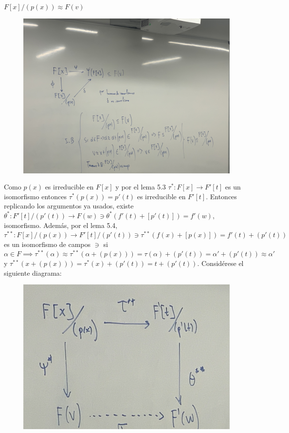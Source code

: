 \begin{teorema}[5I]
\begin{dem}
        
        $F[x]/(p(x))\approx F(v)$ 
        \begin{figure}[H]
            \centering
            \includegraphics[scale=0.2]{imagenes/25.1.jpeg}
        \end{figure}
        Como $p(x)$ es irreducible en $F[x]$ y por el lema 5.3 $\tau^*:F[x]\to F'[t]$ es un isomorfismo entonces $\tau^*(p(x))=p'(t)$ es irreducible en $F'[t]$. Entonces replicando los argumentos ya usados, existe $\theta^*: F'[t]/(p'(t))\to F(w)\ni \theta^*(f'(t)+[p'(t)])=f'(w)$, isomorfismo. Además, por el lema 5.4, $\tau^{**}:F[x]/(p(x))\to F'[t]/(p'(t))\ni \tau^{**}(f(x)+[p(x)])=f'(t)+(p'(t))$ es un isomorfismo de campos $\ni$ si $\alpha\in F\implies \tau^{**}(\alpha)\approx \tau^{**}(\alpha+(p(x)))=\tau(\alpha)+(p'(t))=\alpha' +(p'(t))\approx \alpha'$ y $\tau^{**}(x+(p(x)))=\tau^{*}(x)+(p'(t))=t+(p'(t))$. Considérese el siguiente diagrama: 
        \begin{figure}[H]
            \centering
            \includegraphics[scale=0.15]{imagenes/25.2.jpeg}

\end{figure}
\end{dem}
\end{teorema}
